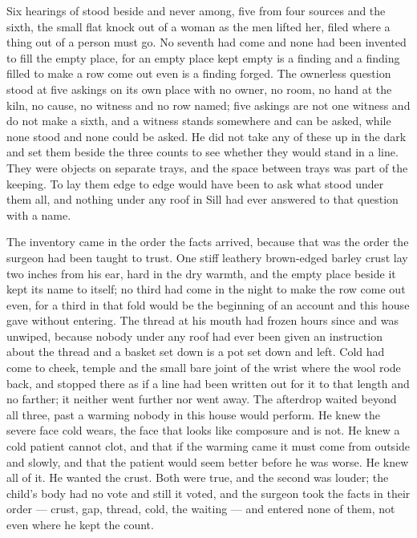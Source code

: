Six hearings of  stood beside and never among, five from four sources and the sixth, the small flat knock out of a woman as the men lifted her, filed where a thing out of a person must go. No seventh had come and none had been invented to fill the empty place, for an empty place kept empty is a finding and a finding filled to make a row come out even is a finding forged. The ownerless question stood at five askings on its own place with no owner, no room, no hand at the kiln, no cause, no witness and no row named; five askings are not one witness and do not make a sixth, and a witness stands somewhere and can be asked, while none stood and none could be asked. He did not take any of these up in the dark and set them beside the three counts to see whether they would stand in a line. They were objects on separate trays, and the space between trays was part of the keeping. To lay them edge to edge would have been to ask what stood under them all, and nothing under any roof in Sill had ever answered to that question with a name.

The inventory came in the order the facts arrived, because that was the order the surgeon had been taught to trust. One stiff leathery brown-edged barley crust lay two inches from his ear, hard in the dry warmth, and the empty place beside it kept its name to itself; no third had come in the night to make the row come out even, for a third in that fold would be the beginning of an account and this house gave without entering. The thread at his mouth had frozen hours since and was unwiped, because nobody under any roof had ever been given an instruction about the thread and a basket set down is a pot set down and left. Cold had come to cheek, temple and the small bare joint of the wrist where the wool rode back, and stopped there as if a line had been written out for it to that length and no farther; it neither went further nor went away. The afterdrop waited beyond all three, past a warming nobody in this house would perform. He knew the severe face cold wears, the face that looks like composure and is not. He knew a cold patient cannot clot, and that if the warming came it must come from outside and slowly, and that the patient would seem better before he was worse. He knew all of it. He wanted the crust. Both were true, and the second was louder; the child's body had no vote and still it voted, and the surgeon took the facts in their order --- crust, gap, thread, cold, the waiting --- and entered none of them, not even where he kept the count.

